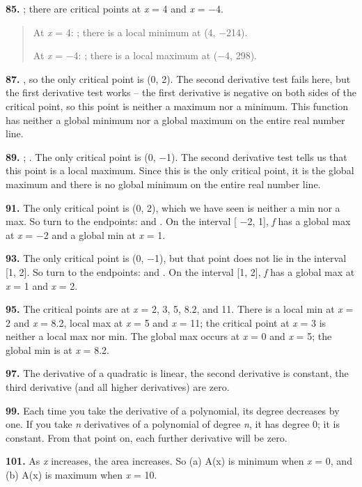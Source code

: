 \textbf{85.} ; there are critical points at \emph{x} = 4 and \emph{x} =
−4.

\begin{quote}
At \emph{x} = 4: ; there is a local minimum at (4, −214).

At \emph{x} = −4: ; there is a local maximum at (−4, 298).
\end{quote}

\textbf{87.} , so the only critical point is (0, 2). The second
derivative test fails here, but the first derivative test works -- the
first derivative is negative on both sides of the critical point, so
this point is neither a maximum nor a minimum. This function has neither
a global minimum nor a global maximum on the entire real number line.

\textbf{89.} ; . The only critical point is (0, −1). The second
derivative test tells us that this point is a local maximum. Since this
is the only critical point, it is the global maximum and there is no
global minimum on the entire real number line.

\textbf{91.} The only critical point is (0, 2), which we have seen is
neither a min nor a max. So turn to the endpoints: and . On the interval
{[} −2, 1{]}, \emph{f} has a global max at \emph{x} = −2 and a global
min at \emph{x} = 1.

\textbf{93.} The only critical point is (0, −1), but that point does not
lie in the interval {[}1, 2{]}. So turn to the endpoints: and . On the
interval {[}1, 2{]}, \emph{f} has a global max at \emph{x} = 1 and
\emph{x} = 2.

\textbf{95.} The critical points are at \emph{x} = 2, 3, 5, 8.2, and 11.
There is a local min at \emph{x} = 2 and \emph{x} = 8.2, local max at
\emph{x} = 5 and \emph{x} = 11; the critical point at \emph{x} = 3 is
neither a local max nor min. The global max occurs at \emph{x} = 0 and
\emph{x} = 5; the global min is at \emph{x} = 8.2.

\textbf{97.} The derivative of a quadratic is linear, the second
derivative is constant, the third derivative (and all higher
derivatives) are zero.

\textbf{99.} Each time you take the derivative of a polynomial, its
degree decreases by one. If you take \emph{n} derivatives of a
polynomial of degree \emph{n}, it has degree 0; it is constant. From
that point on, each further derivative will be zero.

\textbf{101.} As \emph{x} increases, the area increases. So (a) A(x) is
minimum when \emph{x} = 0, and (b) A(x) is maximum when \emph{x} = 10.


